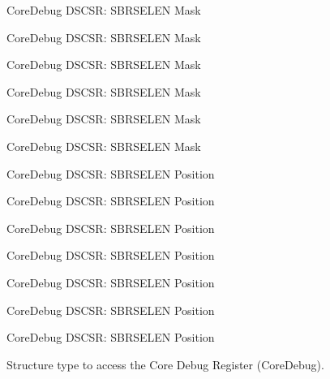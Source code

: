 \begin{DoxyRefList}
\label{deprecated__deprecated000152}%
%
Core\+Debug D\+S\+C\+SR\+: S\+B\+R\+S\+E\+L\+EN Mask 

\label{deprecated__deprecated000228}%
%
Core\+Debug D\+S\+C\+SR\+: S\+B\+R\+S\+E\+L\+EN Mask 

\label{deprecated__deprecated000291}%
%
Core\+Debug D\+S\+C\+SR\+: S\+B\+R\+S\+E\+L\+EN Mask 

\label{deprecated__deprecated000370}%
%
Core\+Debug D\+S\+C\+SR\+: S\+B\+R\+S\+E\+L\+EN Mask 

\label{deprecated__deprecated000446}%
%
Core\+Debug D\+S\+C\+SR\+: S\+B\+R\+S\+E\+L\+EN Mask 

\label{deprecated__deprecated000549}%
%
Core\+Debug D\+S\+C\+SR\+: S\+B\+R\+S\+E\+L\+EN Mask  
\item[Member \mbox{\hyperlink{group__CMSIS__CoreDebug_ga3eb88e444b678057db1b59272eebb1ad}{Core\+Debug\+\_\+\+D\+S\+C\+S\+R\+\_\+\+S\+B\+R\+S\+E\+L\+E\+N\+\_\+\+Pos}} ]\label{deprecated__deprecated000097}%
%
Core\+Debug D\+S\+C\+SR\+: S\+B\+R\+S\+E\+L\+EN Position 

\label{deprecated__deprecated000151}%
%
Core\+Debug D\+S\+C\+SR\+: S\+B\+R\+S\+E\+L\+EN Position 

\label{deprecated__deprecated000227}%
%
Core\+Debug D\+S\+C\+SR\+: S\+B\+R\+S\+E\+L\+EN Position 

\label{deprecated__deprecated000290}%
%
Core\+Debug D\+S\+C\+SR\+: S\+B\+R\+S\+E\+L\+EN Position 

\label{deprecated__deprecated000369}%
%
Core\+Debug D\+S\+C\+SR\+: S\+B\+R\+S\+E\+L\+EN Position 

\label{deprecated__deprecated000445}%
%
Core\+Debug D\+S\+C\+SR\+: S\+B\+R\+S\+E\+L\+EN Position 

\label{deprecated__deprecated000548}%
%
Core\+Debug D\+S\+C\+SR\+: S\+B\+R\+S\+E\+L\+EN Position  
\item[Class \mbox{\hyperlink{structCoreDebug__Type}{Core\+Debug\+\_\+\+Type}} ]\label{deprecated__deprecated000004}%
%
Structure type to access the Core Debug Register (Core\+Debug). 


\end{DoxyRefList}
